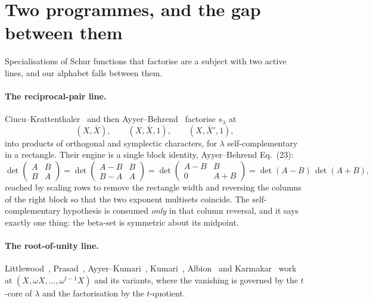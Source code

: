 \documentclass[11pt,a4paper]{article}
\begin{document}
\section{Two programmes, and the gap between them}\label{sec:gap}

Specialisations of Schur functions that factorise are a subject with two active lines, and our
alphabet falls between them.

\paragraph{The reciprocal-pair line.} Ciucu--Krattenthaler~\cite{CK} and then
Ayyer--Behrend~\cite{AB} factorise $s_\lambda$ at
\begin{equation}\label{eq:ABalphabets}
(X,\bar X),\qquad (X,\bar X,1),\qquad (X,\bar X',1),
\end{equation}
into products of orthogonal and symplectic characters, for $\lambda$ self-complementary in a
rectangle. Their engine is a single block identity, Ayyer--Behrend Eq.~(23):
\begin{equation}\label{eq:blockid}
\det\begin{pmatrix}A&B\\B&A\end{pmatrix}
=\det\begin{pmatrix}A-B&B\\B-A&A\end{pmatrix}
=\det\begin{pmatrix}A-B&B\\0&A+B\end{pmatrix}
=\det(A-B)\,\det(A+B),
\end{equation}
reached by scaling rows to remove the rectangle width and reversing the columns of the right
block so that the two exponent multisets coincide. The self-complementary hypothesis is
consumed \emph{only} in that column reversal, and it says exactly one thing: the beta-set is
symmetric about its midpoint.

\paragraph{The root-of-unity line.} Littlewood~\cite{LittlewoodBook}, Prasad~\cite{Prasad}, Ayyer--Kumari~\cite{AK},
Kumari~\cite{Kumari}, Albion~\cite{Albion} and Karmakar~\cite{Karmakar} work at
$(X,\omega X,\dots,\omega^{t-1}X)$ and its variants, where the vanishing is governed by the
$t$-core of $\lambda$ and the factorisation by the $t$-quotient.
\end{document}
